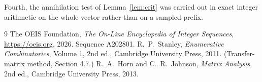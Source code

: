 \documentclass[11pt,a4paper]{article}
\theoremstyle{plain}
\theoremstyle{definition}
\begin{document}
Fourth, the annihilation test of Lemma~\ref{lem:crit} was carried out in exact integer
arithmetic on the whole vector rather than on a sampled prefix.

\begin{thebibliography}{9}
 The OEIS Foundation, \emph{The On-Line Encyclopedia of Integer
Sequences}, \url{https://oeis.org}, 2026. Sequence A202801.
 R.~P.~Stanley, \emph{Enumerative Combinatorics}, Volume 1, 2nd ed.,
Cambridge University Press, 2011. (Transfer-matrix method, Section 4.7.)
 R.~A.~Horn and C.~R.~Johnson, \emph{Matrix Analysis}, 2nd ed., Cambridge
University Press, 2013.
\end{thebibliography}
\end{document}
